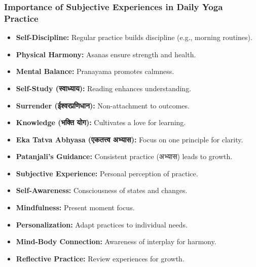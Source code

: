 \begin{frame}[fragile]\frametitle{Importance of Subjective Experiences in Daily Yoga Practice}

    \begin{itemize}
        \item \textbf{Self-Discipline:} Regular practice builds discipline (e.g., morning routines).
        \item \textbf{Physical Harmony:} Asanas ensure strength and health.
        \item \textbf{Mental Balance:} Pranayama promotes calmness.
        \item \textbf{Self-Study (स्वाध्याय):} Reading enhances understanding.
        \item \textbf{Surrender (ईश्वरप्रणिधान):} Non-attachment to outcomes.
        \item \textbf{Knowledge (भक्ति योग):} Cultivates a love for learning.
        \item \textbf{Eka Tatva Abhyasa (एकतत्त्व अभ्यास):} Focus on one principle for clarity.
        \item \textbf{Patanjali's Guidance:} Consistent practice (अभ्यास) leads to growth.
        \item \textbf{Subjective Experience:} Personal perception of practice.
        \item \textbf{Self-Awareness:} Consciousness of states and changes.
        \item \textbf{Mindfulness:} Present moment focus.
        \item \textbf{Personalization:} Adapt practices to individual needs.
        \item \textbf{Mind-Body Connection:} Awareness of interplay for harmony.
        \item \textbf{Reflective Practice:} Review experiences for growth.
    \end{itemize}

\end{frame}

